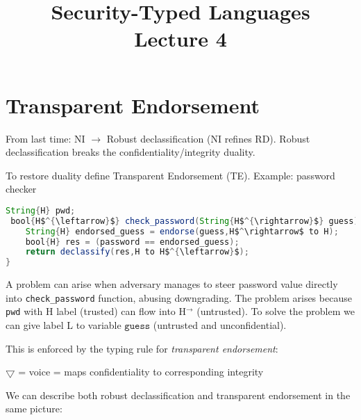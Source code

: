\documentclass{article}
\title{Security-Typed Languages \\ \Large{Lecture 4}}
\begin{document}
\maketitle

\section{Transparent Endorsement}

From last time: NI $\rightarrow$ Robust declassification (NI refines RD). Robust declassification breaks the confidentiality/integrity duality.

To restore duality define
Transparent Endorsement (TE).
Example: password checker
\begin{lstlisting}[mathescape,frame=single,basicstyle=\ttfamily,language=java]
String{H} pwd;
 bool{H$^{\leftarrow}$} check_password(String{H$^{\rightarrow}$} guess) {
    String{H} endorsed_guess = endorse(guess,H$^\rightarrow$ to H);
    bool{H} res = (password == endorsed_guess);
    return declassify(res,H to H$^{\leftarrow}$);
}
\end{lstlisting}
A problem can arise when adversary manages to steer password value directly into \texttt{check\_password} function, abusing downgrading. The problem arises because \texttt{pwd} with H label (trusted) can flow into H$^{\rightarrow}$ (untrusted). To solve the problem we can give label L to variable $\texttt{guess}$ (untrusted and unconfidential).

This is enforced by the typing  rule for \emph{transparent endorsement}:

\begin{prooftree}
\end{prooftree}

$\bigtriangledown$ = voice = maps confidentiality to corresponding integrity

We can describe both robust declassification and transparent endorsement in the same picture:

\end{document}
